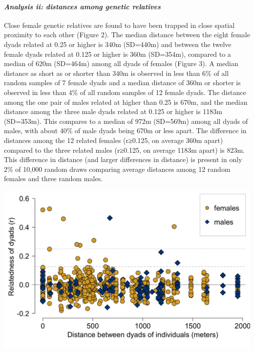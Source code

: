 \documentclass[
]{article}
\begin{document}
\newpage

\hypertarget{analysis-ii-distances-among-genetic-relatives-1}{%
\paragraph{\texorpdfstring{\emph{Analysis ii: distances among genetic
relatives}}{Analysis ii: distances among genetic relatives}}\label{analysis-ii-distances-among-genetic-relatives-1}}

Close female genetic relatives are found to have been trapped in close
spatial proximity to each other (Figure 2). The median distance between
the eight female dyads related at 0.25 or higher is 340m (SD=440m) and
between the twelve female dyads related at 0.125 or higher is 360m
(SD=354m), compared to a median of 620m (SD=464m) among all dyads of
females (Figure 3). A median distance as short as or shorter than 340m
is observed in less than 6\% of all random samples of 7 female dyads and
a median distance of 360m or shorter is observed in less than 4\% of all
random samples of 12 female dyads. The distance among the one pair of
males related at higher than 0.25 is 670m, and the median distance among
the three male dyads related at 0.125 or higher is 1183m (SD=353m). This
compares to a median of 972m (SD=569m) among all dyads of males, with
about 40\% of male dyads being 670m or less apart. The difference in
distances among the 12 related females (r≥0.125, on average 360m apart)
compared to the three related males (r≥0.125, on average 1183m apart) is
823m. This difference in distance (and larger differences in distance)
is present in only 2\% of 10,000 random draws comparing average
distances among 12 random females and three random males.

\includegraphics{gdispersal_Figure2.png}
\end{document}
